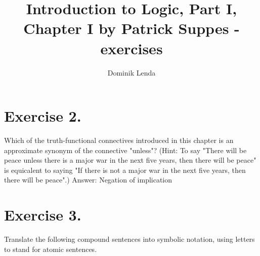 \documentclass{article}
\title{Introduction to Logic, Part I, Chapter I by Patrick Suppes - exercises}
\author{Dominik Lenda}
\begin{document}
\maketitle

\section*{Exercise 2.}
Which of the truth-functional connectives introduced in this chapter is an approximate synonym of the connective "unless"? (Hint: To say "There will be peace unless there is a major war in the next five years, then there will be peace" is equicalent to saying "If there is not a major war in the next five years, then there will be peace".)
\singlespace
Answer: Negation of implication

\section*{Exercise 3.}

Translate the following compound sentences into symbolic notation, using letters to stand for atomic sentences. 
\end{document}
